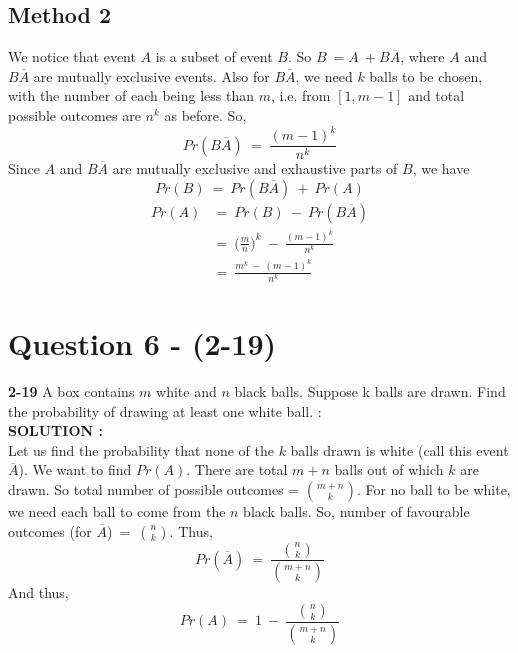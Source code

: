 \documentclass{article}
\begin{document}
\subsection*{Method 2}
We notice that event $A$ is a subset of event $B$. So $B\ = A\ + B\overline{A}$, where $A$ and $B\overline{A}$ are mutually exclusive events. 
Also for $B\overline{A}$, we need $k$ balls to be chosen, with the number of each being less than $m$, i.e. from $[1,m-1]$ and total possible outcomes are $n^k$ as before. So,
\begin{equation*}
    Pr(B\overline{A})\ =\ \frac{(m-1)^k}{n^k}
\end{equation*}
Since $A$ and $B\overline{A}$ are mutually exclusive and exhaustive parts of $B$, we have
\begin{equation*}
    Pr(B)\ =\ Pr(B\overline{A})\ +\ Pr(A)
\end{equation*}
\begin{equation*}
    \begin{split}
        Pr(A) &=\ Pr(B)\ -\ Pr(B\overline{A}) \\
              &=\ \Big(\frac{m}{n}\Big)^k\ -\ \frac{(m-1)^k}{n^k} \\
              &=\ \frac{m^k\ -\ (m-1)^k}{n^k}
    \end{split}
\end{equation*}

\section{Question 6 - (2-19)}
\label{Q6}
\textbf{2-19} A box contains $m$ white and $n$ black balls. Suppose k balls are drawn. Find the probability of drawing at least one white ball.  : \\

\hspace{1em} \large{\textbf{SOLUTION :}} \\
Let us find the probability that none of the $k$ balls drawn is white (call this event $\overline{A}$). We want to find $Pr(A)$. There are total $m+n$ balls out of which $k$ are drawn. So total number of possible outcomes = ${ m+n \choose k}$. For no ball to be white, we need each ball to  come from the $n$ black balls. So, number of favourable outcomes (for $\overline{A}$)\ =\ ${ n \choose k}$. Thus,
\begin{equation*}
    Pr(\overline{A})\ =\ \frac{{n \choose k}}{{m+n \choose k}}
\end{equation*}
And thus, 
\begin{equation*}
    Pr(A)\ =\ 1\ -\ \frac{{n \choose k}}{{m+n \choose k}}
\end{equation*}
\end{document}
